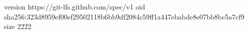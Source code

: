 version https://git-lfs.github.com/spec/v1
oid sha256:323d8959ef00ef29502118b6bb9df2084c59ff1a447ebabde8e07bb8bc5a7cf9
size 2222

